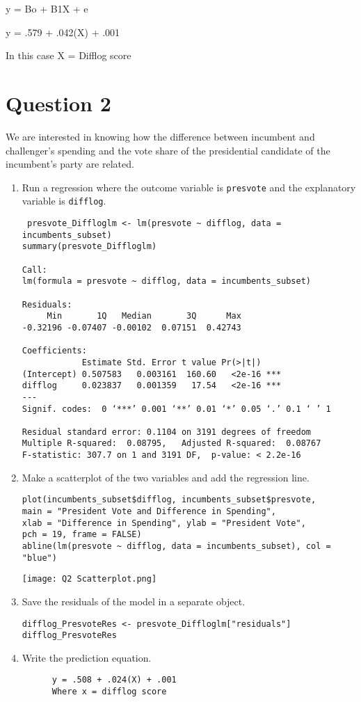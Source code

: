 \documentclass[12pt,letterpaper]{article}
\begin{document}
y = Bo + B1X + e

y = .579 + .042(X) + .001

In this case X = Difflog score
	
\newpage

\section*{Question 2}
\noindent We are interested in knowing how the difference between incumbent and challenger's spending and the vote share of the presidential candidate of the incumbent's party are related.	\vspace{.25cm}
	\begin{enumerate}
		\item Run a regression where the outcome variable is \texttt{presvote} and the explanatory variable is \texttt{difflog}.
\begin{verbatim}
 presvote_Diffloglm <- lm(presvote ~ difflog, data = incumbents_subset)
summary(presvote_Diffloglm)  

Call:
lm(formula = presvote ~ difflog, data = incumbents_subset)

Residuals:
     Min       1Q   Median       3Q      Max 
-0.32196 -0.07407 -0.00102  0.07151  0.42743 

Coefficients:
            Estimate Std. Error t value Pr(>|t|)    
(Intercept) 0.507583   0.003161  160.60   <2e-16 ***
difflog     0.023837   0.001359   17.54   <2e-16 ***
---
Signif. codes:  0 ‘***’ 0.001 ‘**’ 0.01 ‘*’ 0.05 ‘.’ 0.1 ‘ ’ 1

Residual standard error: 0.1104 on 3191 degrees of freedom
Multiple R-squared:  0.08795,	Adjusted R-squared:  0.08767 
F-statistic: 307.7 on 1 and 3191 DF,  p-value: < 2.2e-16
\end{verbatim}


		\item Make a scatterplot of the two variables and add the regression line. 	

\begin{verbatim}
plot(incumbents_subset$difflog, incumbents_subset$presvote, 
main = "President Vote and Difference in Spending",
xlab = "Difference in Spending", ylab = "President Vote",
pch = 19, frame = FALSE)
abline(lm(presvote ~ difflog, data = incumbents_subset), col = "blue")

\end{verbatim}

 \texttt{[image: Q2 Scatterplot.png]}


		\item Save the residuals of the model in a separate object.	
  \begin{verbatim}
difflog_PresvoteRes <- presvote_Diffloglm["residuals"]
difflog_PresvoteRes
  \end{verbatim}
  
		\item Write the prediction equation.
  \begin{verbatim}
      y = .508 + .024(X) + .001
      Where x = difflog score
      
  \end{verbatim}
	\end{enumerate}
	
\end{document}
